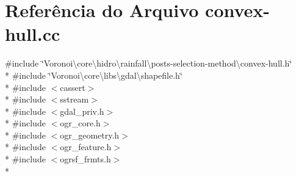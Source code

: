 \section{Referência do Arquivo convex-\/hull.cc}
\label{convex-hull_8cc}
{\ttfamily \#include \char`\"{}Voronoi\textbackslash{}core\textbackslash{}hidro\textbackslash{}rainfall\textbackslash{}posts-\/selection-\/method\textbackslash{}convex-\/hull.\+h\char`\"{}}\\*
{\ttfamily \#include \char`\"{}Voronoi\textbackslash{}core\textbackslash{}libs\textbackslash{}gdal\textbackslash{}shapefile.\+h\char`\"{}}\\*
{\ttfamily \#include $<$cassert$>$}\\*
{\ttfamily \#include $<$sstream$>$}\\*
{\ttfamily \#include $<$gdal\+\_\+priv.\+h$>$}\\*
{\ttfamily \#include $<$ogr\+\_\+core.\+h$>$}\\*
{\ttfamily \#include $<$ogr\+\_\+geometry.\+h$>$}\\*
{\ttfamily \#include $<$ogr\+\_\+feature.\+h$>$}\\*
{\ttfamily \#include $<$ogrsf\+\_\+frmts.\+h$>$}\\*
